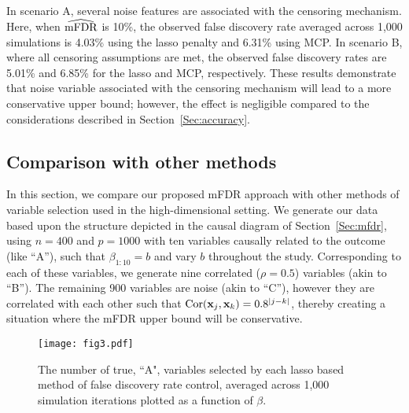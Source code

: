 

In scenario A, several noise features are associated with the censoring mechanism.  Here, when $\widehat{\textrm{mFDR}}$ is 10\%, the observed false discovery rate averaged across 1,000 simulations is 4.03\% using the lasso penalty and 6.31\% using MCP.  In scenario B, where all censoring assumptions are met, the observed false discovery rates are 5.01\% and 6.85\% for the lasso and MCP, respectively.  These results demonstrate that noise variable associated with the censoring mechanism will lead to a more conservative upper bound; however, the effect is negligible compared to the considerations described in Section~\ref{Sec:accuracy}.

\subsection{Comparison with other methods}
\label{Sec:sim-comp}

In this section, we compare our proposed mFDR approach with other methods of variable selection used in the high-dimensional setting. We generate our data based upon the structure depicted in the causal diagram of Section~\ref{Sec:mfdr}, using $n = 400$ and $p = 1000$ with ten variables causally related to the outcome (like ``A''), such that $\beta_{1:10} = b$ and vary $b$ throughout the study. Corresponding to each of these variables, we generate nine correlated ($\rho = 0.5$) variables (akin to ``B''). The remaining 900 variables are noise (akin to ``C''), however they are correlated with each other such that $\textrm{Cor}(\mathbf{x}_j,\mathbf{x}_k) = 0.8^{|j - k|}$, thereby creating a situation where the mFDR upper bound will be conservative.

\begin{figure} [htb!]
 \centering
  \texttt{[image: fig3.pdf]}
  \caption{\label{Fig:lassopower} The number of true, ``A", variables selected by each lasso based method of false discovery rate control, averaged across 1,000 simulation iterations plotted as a function of $\beta$.}
\end{figure}

